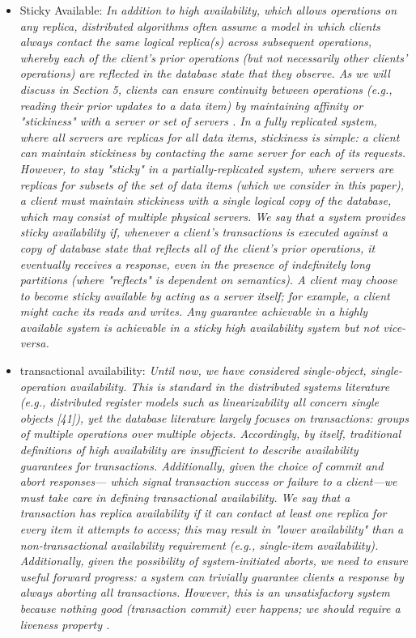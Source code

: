 \documentclass[a4paper,10pt,titlepage]{report}
\begin{document}
\begin{itemize}
    \item Sticky Available: \textit{In addition to high availability, which allows operations on any    replica, distributed algorithms often assume a model in which clients    always contact the same logical replica(s) across subsequent operations, whereby each of the client's prior operations (but not necessarily other clients' operations) are reflected in the database state    that they observe. As we will discuss in Section 5, clients can ensure continuity between operations (e.g., reading their prior updates    to a data item) by maintaining affinity or "stickiness" with a server    or set of servers . In a fully replicated system, where all servers    are replicas for all data items, stickiness is simple: a client can    maintain stickiness by contacting the same server for each of its requests. However, to stay "sticky" in a partially-replicated system,    where servers are replicas for subsets of the set of data items (which    we consider in this paper), a client must maintain stickiness with a    single logical copy of the database, which may consist of multiple    physical servers. We say that a system provides sticky availability if, whenever a client's transactions is executed against a copy    of database state that reflects all of the client's prior operations, it    eventually receives a response, even in the presence of indefinitely    long partitions (where "reflects" is dependent on semantics). A    client may choose to become sticky available by acting as a server    itself; for example, a client might cache its reads and writes. Any guarantee achievable in a highly available system is    achievable in a sticky high availability system but not vice-versa.}\cite{HighlyAvailableTransactionsVirtuesandLimitations}
    \item transactional availability: \textit{Until now, we have considered single-object, single-operation    availability. This is standard in the distributed systems literature    (e.g., distributed register models such as linearizability all concern    single objects [41]), yet the database literature largely focuses on    transactions: groups of multiple operations over multiple objects.    Accordingly, by itself, traditional definitions of high availability    are insufficient to describe availability guarantees for transactions.    Additionally, given the choice of commit and abort responses—    which signal transaction success or failure to a client—we must    take care in defining transactional availability.    We say that a transaction has replica availability if it can contact    at least one replica for every item it attempts to access; this may result in "lower availability" than a non-transactional availability    requirement (e.g., single-item availability). Additionally, given the    possibility of system-initiated aborts, we need to ensure useful forward progress: a system can trivially guarantee clients a response    by always aborting all transactions. However, this is an unsatisfactory system because nothing good (transaction commit) ever happens; we should require a liveness property .    
}
\end{itemize}
\end{document}

